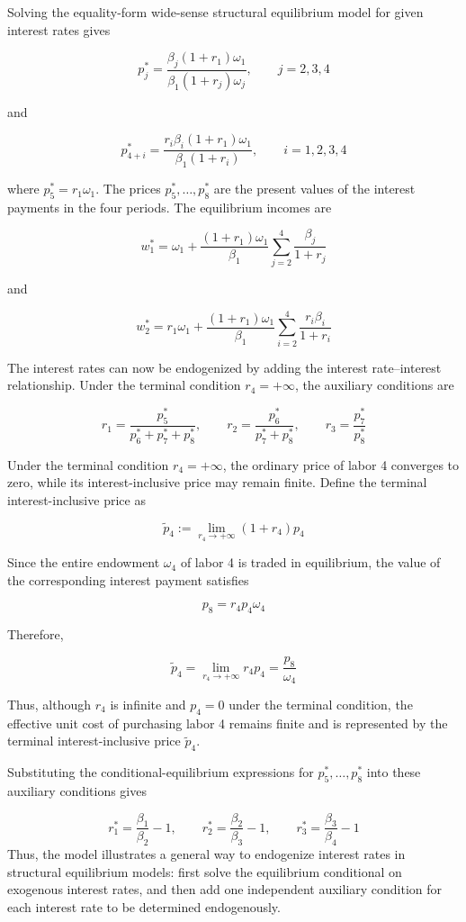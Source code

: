 \documentclass[
  letterpaper,
  DIV=11,
  numbers=noendperiod]{scrreprt}
\begin{document}
Solving the equality-form wide-sense structural equilibrium model for
given interest rates gives

\[
p_j^*
=
\frac{\beta_j(1+r_1)\omega_1}
{\beta_1(1+r_j)\omega_j},
\qquad j=2,3,4
\]

and

\[
p_{4+i}^*
=
\frac{r_i\beta_i(1+r_1)\omega_1}
{\beta_1(1+r_i)},
\qquad i=1,2,3,4
\]

where \(p_5^*=r_1\omega_1\). The prices \(p_5^*,\ldots,p_8^*\) are the
present values of the interest payments in the four periods. The
equilibrium incomes are

\[
w_1^*
=
\omega_1
+
\frac{(1+r_1)\omega_1}{\beta_1}
\sum_{j=2}^4\frac{\beta_j}{1+r_j}
\]

and

\[
w_2^*
=
r_1\omega_1
+
\frac{(1+r_1)\omega_1}{\beta_1}
\sum_{i=2}^4\frac{r_i\beta_i}{1+r_i}
\]

The interest rates can now be endogenized by adding the interest
rate--interest relationship. Under the terminal condition
\(r_4=+\infty\), the auxiliary conditions are

\[
r_1
=
\frac{p_5^*}{p_6^*+p_7^*+p_8^*},
\qquad
r_2
=
\frac{p_6^*}{p_7^*+p_8^*},
\qquad
r_3
=
\frac{p_7^*}{p_8^*}
\]

Under the terminal condition \(r_4=+\infty\), the ordinary price of
labor 4 converges to zero, while its interest-inclusive price may remain
finite. Define the terminal interest-inclusive price as

\[
\widetilde p_4
:=
\lim_{r_4\to+\infty}(1+r_4)p_4
\]

Since the entire endowment \(\omega_4\) of labor 4 is traded in
equilibrium, the value of the corresponding interest payment satisfies

\[
p_8
=
r_4p_4\omega_4
\]

Therefore,

\[
\widetilde p_4
=
\lim_{r_4\to+\infty}r_4p_4
=
\frac{p_8}{\omega_4}
\]

Thus, although \(r_4\) is infinite and \(p_4=0\) under the terminal
condition, the effective unit cost of purchasing labor 4 remains finite
and is represented by the terminal interest-inclusive price
\(\widetilde p_4\).

Substituting the conditional-equilibrium expressions for
\(p_5^*,\ldots,p_8^*\) into these auxiliary conditions gives

\[
r_1^*
=
\frac{\beta_1}{\beta_2}-1,
\qquad
r_2^*
=
\frac{\beta_2}{\beta_3}-1,
\qquad
r_3^*
=
\frac{\beta_3}{\beta_4}-1
\] Thus, the model illustrates a general way to endogenize interest
rates in structural equilibrium models: first solve the equilibrium
conditional on exogenous interest rates, and then add one independent
auxiliary condition for each interest rate to be determined
endogenously.
\end{document}
